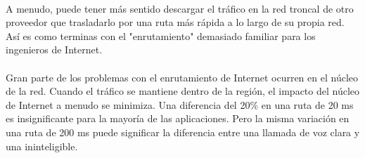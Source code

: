 \\
A menudo, puede tener más sentido descargar el tráfico en la red troncal de otro proveedor que trasladarlo por una ruta más rápida a lo largo de su propia red. Así es como terminas con el "enrutamiento" demasiado familiar para los ingenieros de Internet.
\\
\\
Gran parte de los problemas con el enrutamiento de Internet ocurren en el núcleo de la red. Cuando el tráfico se mantiene dentro de la región, el impacto del núcleo de Internet a menudo se minimiza. Una diferencia del 20\% en una ruta de 20 ms es insignificante para la mayoría de las aplicaciones. Pero la misma variación en una ruta de 200 ms puede significar la diferencia entre una llamada de voz clara y una ininteligible.

